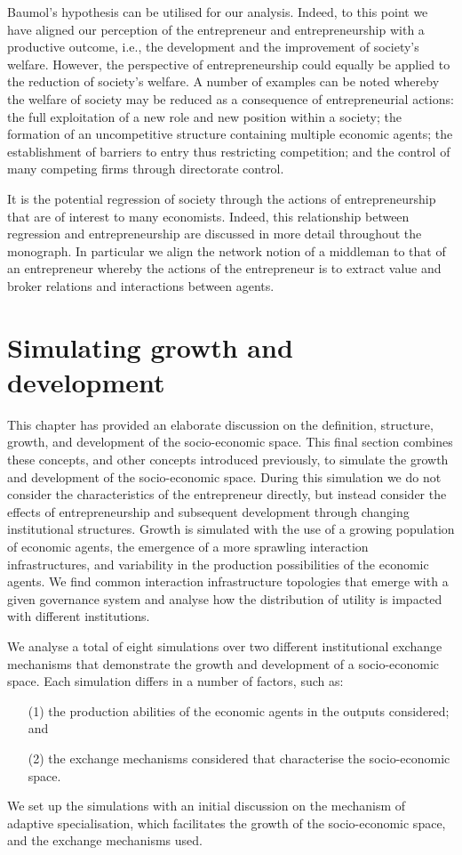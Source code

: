 Baumol's hypothesis can be utilised for our analysis. Indeed, to this point we have aligned our perception of the entrepreneur and entrepreneurship with a productive outcome, i.e., the development and the improvement of society's welfare. However, the perspective of entrepreneurship could equally be applied to the reduction of society's welfare. A number of examples can be noted whereby the welfare of society may be reduced as a consequence of entrepreneurial actions: the full exploitation of a new role and new position within a society; the formation of an uncompetitive structure containing multiple economic agents; the establishment of barriers to entry thus restricting competition; and the control of many competing firms through directorate control.

It is the potential regression of society through the actions of entrepreneurship that are of interest to many economists. Indeed, this relationship between regression and entrepreneurship are discussed in more detail throughout the monograph. In particular we align the network notion of a middleman to that of an entrepreneur whereby the actions of the entrepreneur is to extract value and broker relations and interactions between agents.

\section{Simulating growth and development}
\label{sec:Simulations}

This chapter has provided an elaborate discussion on the definition, structure, growth, and development of the socio-economic space. This final section combines these concepts, and other concepts introduced previously, to simulate the growth and development of the socio-economic space. During this simulation we do not consider the characteristics of the entrepreneur directly, but instead consider the effects of entrepreneurship and subsequent development through changing institutional structures. Growth is simulated with the use of a growing population of economic agents, the emergence of a more sprawling interaction infrastructures, and variability in the production possibilities of the economic agents. We find common interaction infrastructure topologies that emerge with a given governance system and analyse how the distribution of utility is impacted with different institutions.

We analyse a total of eight simulations over two different institutional exchange mechanisms that demonstrate the growth and development of a socio-economic space. Each simulation differs in a number of factors, such as: 
\begin{itemize}
\item[(1)] the production abilities of the economic agents in the outputs considered; and 
\item[(2)] the exchange mechanisms considered that characterise the socio-economic space. 
\end{itemize}
We set up the simulations with an initial discussion on the mechanism of adaptive specialisation, which facilitates the growth of the socio-economic space, and the exchange mechanisms used.

